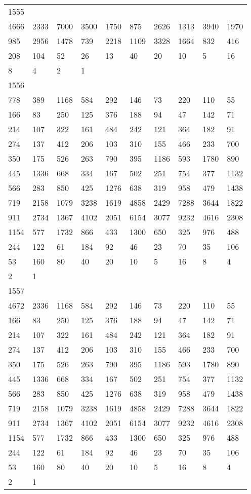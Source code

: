 \begin{longtable}{*{10}{l}}
1555&&&&&&&&&\\
4666& 2333& 7000& 3500& 1750& 875& 2626& 1313& 3940& 1970\\
985& 2956& 1478& 739& 2218& 1109& 3328& 1664& 832& 416\\
208& 104& 52& 26& 13& 40& 20& 10& 5& 16\\
8& 4& 2& 1& \\

1556&&&&&&&&&\\
778& 389& 1168& 584& 292& 146& 73& 220& 110& 55\\
166& 83& 250& 125& 376& 188& 94& 47& 142& 71\\
214& 107& 322& 161& 484& 242& 121& 364& 182& 91\\
274& 137& 412& 206& 103& 310& 155& 466& 233& 700\\
350& 175& 526& 263& 790& 395& 1186& 593& 1780& 890\\
445& 1336& 668& 334& 167& 502& 251& 754& 377& 1132\\
566& 283& 850& 425& 1276& 638& 319& 958& 479& 1438\\
719& 2158& 1079& 3238& 1619& 4858& 2429& 7288& 3644& 1822\\
911& 2734& 1367& 4102& 2051& 6154& 3077& 9232& 4616& 2308\\
1154& 577& 1732& 866& 433& 1300& 650& 325& 976& 488\\
244& 122& 61& 184& 92& 46& 23& 70& 35& 106\\
53& 160& 80& 40& 20& 10& 5& 16& 8& 4\\
2& 1& \\

1557&&&&&&&&&\\
4672& 2336& 1168& 584& 292& 146& 73& 220& 110& 55\\
166& 83& 250& 125& 376& 188& 94& 47& 142& 71\\
214& 107& 322& 161& 484& 242& 121& 364& 182& 91\\
274& 137& 412& 206& 103& 310& 155& 466& 233& 700\\
350& 175& 526& 263& 790& 395& 1186& 593& 1780& 890\\
445& 1336& 668& 334& 167& 502& 251& 754& 377& 1132\\
566& 283& 850& 425& 1276& 638& 319& 958& 479& 1438\\
719& 2158& 1079& 3238& 1619& 4858& 2429& 7288& 3644& 1822\\
911& 2734& 1367& 4102& 2051& 6154& 3077& 9232& 4616& 2308\\
1154& 577& 1732& 866& 433& 1300& 650& 325& 976& 488\\
244& 122& 61& 184& 92& 46& 23& 70& 35& 106\\
53& 160& 80& 40& 20& 10& 5& 16& 8& 4\\
2& 1& \\


\end{longtable}
